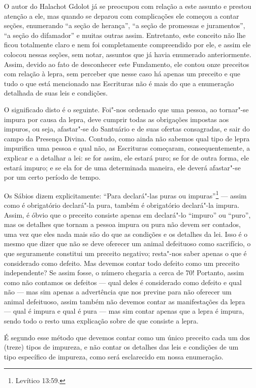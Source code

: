 O autor do Halachot Gdolot\starr{} já se preocupou com relação a este
assunto e prestou atenção a ele, mas quando se deparou com complicações
ele começou a contar seções, enumerando ``a seção de herança'', ``a
seção de promessas e juramentos'', ``a seção do difamador'' e muitas
outras assim. Entretanto, este conceito não lhe ficou totalmente claro
e nem foi completamente compreendido por ele, e assim ele colocou
nessas seções, sem notar, assuntos que já havia enumerado
anteriormente. Assim, devido ao fato de desconhecer este Fundamento,
ele contou onze preceitos com relação à lepra, sem perceber que nesse
caso há apenas um preceito e que tudo o que está mencionado nas
Escrituras não é mais do que a enumeração detalhada de suas leis e
condições.

O significado disto é o seguinte. Foi"-nos ordenado que uma pessoa, ao
tornar"-se impura por causa da lepra, deve cumprir todas as obrigações
impostas aos impuros, ou seja, afastar"-se do Santuário e de suas
ofertas consagradas, e sair do campo da Presença Divina. Contudo, como
ainda não sabemos qual tipo de lepra impurifica uma pessoa e qual não,
as Escrituras começaram, consequentemente, a explicar e a detalhar a
lei: se for assim, ele estará puro; se for de outra forma, ele estará
impuro; e se ela for de uma determinada maneira, ele deverá afastar"-se
por um certo período de tempo.

Os Sábios dizem explicitamente: ``Para declará"-las puras ou impuras''\footnote{Levítico 13:59.} --- assim como é obrigatório declará"-la pura, também é
obrigatório declará"-la impura. Assim, é óbvio que o preceito consiste
apenas em declará"-lo ``impuro'' ou ``puro'', mas os detalhes que tornam
a pessoa impura ou pura não devem ser contados, uma vez que eles nada
mais são do que as condições e os detalhes da lei. Isso é o mesmo que
dizer que não se deve oferecer um animal defeituoso como sacrifício, o
que seguramente constitui um preceito negativo; resta"-nos saber apenas
o que é considerado como defeito. Mas devemos contar todo defeito como
um preceito independente? Se assim fosse, o número chegaria a cerca de
70! Portanto, assim como não contamos os defeitos --- qual deles é
considerado como defeito e qual não --- mas sim apenas a advertência que
nos previne para não oferecer um animal defeituoso, assim também não
devemos contar as manifestações da lepra --- qual é impura e qual é pura
--- mas sim contar apenas que a lepra é impura, sendo todo o resto uma
explicação sobre de que consiste a lepra.

É segundo esse método que devemos contar como um único preceito cada um
dos (treze) tipos de impureza, e não contar os detalhes das leis e
condições de um tipo específico de impureza, como será esclarecido em
nossa enumeração.

